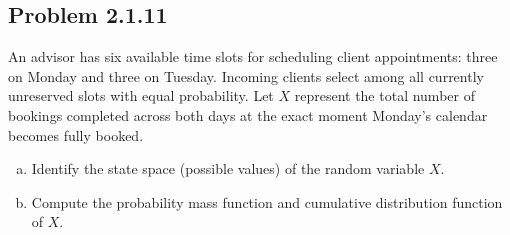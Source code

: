 \documentclass{article}
\begin{document}
\subsection*{Problem 2.1.11}
An advisor has six available time slots for scheduling client appointments: three on Monday and three on Tuesday. Incoming clients select among all currently unreserved slots with equal probability. Let $X$ represent the total number of bookings completed across both days at the exact moment Monday's calendar becomes fully booked.
\begin{enumerate}[(a)]
    \item Identify the state space (possible values) of the random variable $X$.
    \item Compute the probability mass function and cumulative distribution function of $X$.
\end{enumerate}
\end{document}
